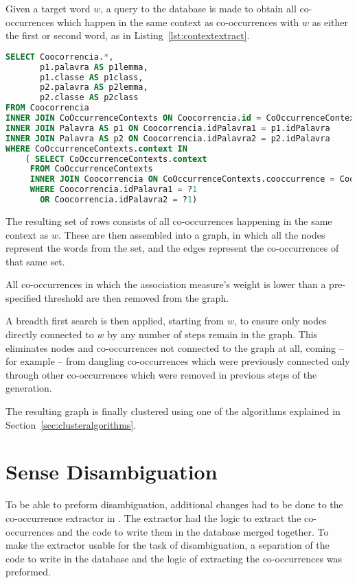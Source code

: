 Given a target word $w$, a query to the database is made to obtain all
co-occurrences which happen in the same context as co-occurrences with $w$ as
either the first or second word, as in Listing~\ref{lst:contextextract}.

\begin{lstlisting}[language=SQL,float=h,caption=SQL Query to extract all
co-occurrences in same context as the target word,label=lst:contextextract]
SELECT Coocorrencia.*,
       p1.palavra AS p1lemma,
       p1.classe AS p1class,
       p2.palavra AS p2lemma,
       p2.classe AS p2class
FROM Coocorrencia
INNER JOIN CoOccurrenceContexts ON Coocorrencia.id = CoOccurrenceContexts.cooccurrence
INNER JOIN Palavra AS p1 ON Coocorrencia.idPalavra1 = p1.idPalavra
INNER JOIN Palavra AS p2 ON Coocorrencia.idPalavra2 = p2.idPalavra
WHERE CoOccurrenceContexts.context IN
    ( SELECT CoOccurrenceContexts.context
     FROM CoOccurrenceContexts
     INNER JOIN Coocorrencia ON CoOccurrenceContexts.cooccurrence = Coocorrencia.id
     WHERE Coocorrencia.idPalavra1 = ?1
       OR Coocorrencia.idPalavra2 = ?1)
\end{lstlisting}

The resulting set of rows consists of all co-occurrences happening in the same
context as $w$. These are then assembled into a graph, in which all the nodes
represent the words from the set, and the edges represent the co-occurrences of
that same set.

All co-occurrences in which the association measure's weight is lower than a
pre-specified threshold are then removed from the graph.

A breadth first search is then applied, starting from $w$, to ensure only nodes
directly connected to $w$ by any number of steps remain in the graph. This
eliminates nodes and co-occurrences not connected to the graph at all, coming
-- for example -- from dangling co-occurrences which were previously connected
only through other co-occurrences which were removed in previous steps of the
generation.

The resulting graph is finally clustered using one of the algorithms explained
in Section~\ref{sec:clusteralgorithms}.

\section{Sense Disambiguation}

To be able to preform disambiguation, additional changes had to be done to the
co-occurrence extractor in \cite{correia2015syntax}. The extractor had the logic
to extract the co-occurrences and the code to write them in the database merged
together. To make the extractor usable for the task of disambiguation, a
separation of the code to write in the database and the logic of extracting the
co-occurrences was preformed.

